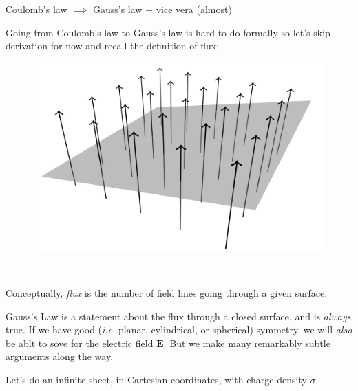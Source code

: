 \documentclass{article}
\begin{document}
\begin{center}
    Coulomb's law $\implies$ Gauss's law + vice vera (almost)
\end{center}

Going from Coulomb's law to Gauss's law is hard to do formally so let's skip derivation for now and recall the definition of flux:

\begin{minipage}{0.3\textwidth}
\begin{figure}[H]
\centering
\includegraphics[width=\textwidth]{figures/2l7.png}
\end{figure}
\end{minipage}
~
\begin{minipage}{0.6\textwidth}
    Conceptually, \emph{flux} is the number of field lines going through a given surface.
\end{minipage}

\vspace{1em}

Gauss's Law is a statement about the flux through a closed surface, and is \emph{always} true. If we have good (\textit{i.e.} planar, cylindrical, or spherical) symmetry, we will \emph{also} be ablt to sove for the electric field $\bm{E}$. But we make many remarkably subtle arguments along the way.

\vspace{0.5em}

Let's do an infinite sheet, in Cartesian coordinates, with charge density $\sigma$.

\vspace{0.5em}
\end{document}
